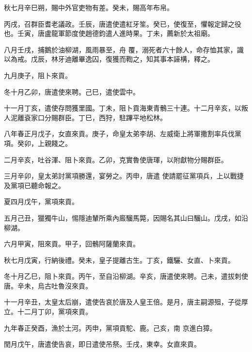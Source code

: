 \begin{pinyinscope}
 秋七月辛巳朔，賜中外官吏物有差。癸未，賜高年布帛。



 丙戌，召群臣耆老議政。壬辰，唐遣使遣紅牙笙。癸已，使復至，懼報定歸之役也。壬寅，唐盧龍軍節度使趙德鈞遣人進時果。丁未，薦新於太祖廟。



 八月壬戌，捕鵝於油柳湖，風雨暴至，舟
 覆，溺死者六十餘人，命存恤其家，識以為戒。戊辰，林牙迪離畢逸囚，復獲而鞫之，知其事本誣構，釋之。



 九月庚子，阻卜來貢。



 冬十月乙卯，唐遣使來聘。己巳，遣使雲中。



 十一月丁亥，遣使存問獲里國。丁未，阻卜貢海東青鶻三十連。十二月辛亥，以叛人泥離袞家口分賜群臣。丁巳，西狩，駐蹕平地松林。



 八年春正月戊子，女直來貢。庚子，命皇太弟李胡、左威衛上將軍撒割率兵伐黨項。癸卯，上親餞之。



 二月辛亥，吐谷渾、阻卜來貢。乙卯，克實魯使唐琿，以附獻物分賜群臣。



 三月辛卯，皇太弟討黨項勝還，宴勞之。丙申，唐遣
 使請罷征黨項兵，上以戰捷及黨項已聽命報之。



 夏四月戊午，黨項來貢。



 五月己丑，獵獨牛山，惕隱迪輦所乘內廄騮馬斃，因賜名其山曰騮山。戊戌，如沿柳湖。



 六月甲寅，阻來貢。甲子，回鶻阿薩蘭來貢。



 秋七月戊寅，行納後禮。癸未，皇子提離古生。丁亥，鐵驪、女直、卜來貢。



 冬十月乙巳，阻卜來貢。丙午，至自沿柳湖。辛亥，唐遣使來聘。己未，遣拔刺使唐。辛未，烏古吐魯沒來貢。



 十一月辛丑，太皇太后崩，遣使告哀於唐及人皇王倍。是月，唐主嗣源殂，子從厚立。十二月丁卯，黨項來貢。



 九年春正癸酉，漁於土河。丙申，黨項貢駝、鹿。己亥，南
 京進白獐。



 閏月戊午，唐遣使告哀，即日遣使吊祭。壬戌，東幸。女直來貢。




\end{pinyinscope}
